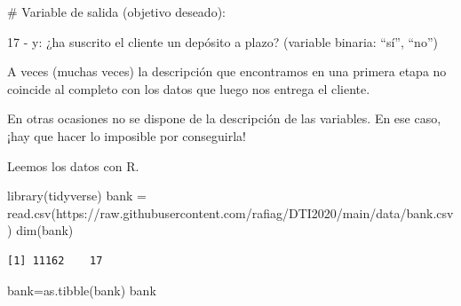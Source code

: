 \documentclass[
  letterpaper,
  DIV=11,
  numbers=noendperiod]{scrreprt}
\newenvironment{Shaded}{\begin{snugshade}}{\end{snugshade}}
\newcommand{\FunctionTok}[1]{\textcolor[rgb]{0.28,0.35,0.67}{#1}}
\newcommand{\NormalTok}[1]{\textcolor[rgb]{0.00,0.23,0.31}{#1}}
\newcommand{\OtherTok}[1]{\textcolor[rgb]{0.00,0.23,0.31}{#1}}
\newcommand{\StringTok}[1]{\textcolor[rgb]{0.13,0.47,0.30}{#1}}
\begin{document}
\# Variable de salida (objetivo deseado):

17 - y: ¿ha suscrito el cliente un depósito a plazo? (variable binaria:
``sí'', ``no'')

\begin{tcolorbox}[enhanced jigsaw, arc=.35mm, breakable, coltitle=black, left=2mm, opacityback=0, bottomtitle=1mm, colbacktitle=quarto-callout-important-color!10!white, title=\textcolor{quarto-callout-important-color}{\faExclamation}\hspace{0.5em}{Para recordar}, titlerule=0mm, colback=white, colframe=quarto-callout-important-color-frame, bottomrule=.15mm, rightrule=.15mm, opacitybacktitle=0.6, toptitle=1mm, toprule=.15mm, leftrule=.75mm]

A veces (muchas veces) la descripción que encontramos en una primera
etapa no coincide al completo con los datos que luego nos entrega el
cliente.

En otras ocasiones no se dispone de la descripción de las variables. En
ese caso, ¡hay que hacer lo imposible por conseguirla!

\end{tcolorbox}

Leemos los datos con R.

\begin{Shaded}
\begin{Highlighting}[]
\FunctionTok{library}\NormalTok{(tidyverse)}
\NormalTok{bank }\OtherTok{=} \FunctionTok{read.csv}\NormalTok{(}\StringTok{\textquotesingle{}https://raw.githubusercontent.com/rafiag/DTI2020/main/data/bank.csv\textquotesingle{}}\NormalTok{)}
\FunctionTok{dim}\NormalTok{(bank)}
\end{Highlighting}
\end{Shaded}

\begin{verbatim}
[1] 11162    17
\end{verbatim}

\begin{Shaded}
\begin{Highlighting}[]
\NormalTok{bank}\OtherTok{=}\FunctionTok{as.tibble}\NormalTok{(bank)}
\NormalTok{bank}
\end{Highlighting}
\end{Shaded}
\end{document}
